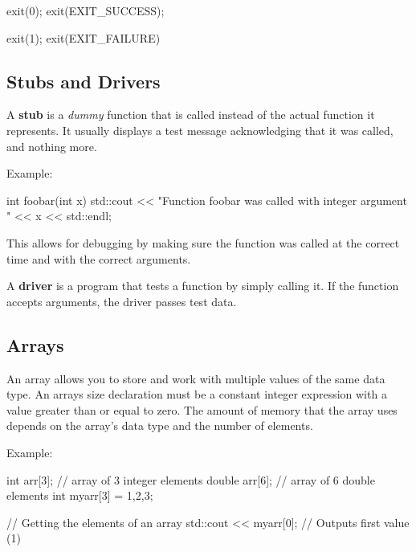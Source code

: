 \documentclass{report}
\begin{document}
    \begin{cppcode}
exit(0);
exit(EXIT_SUCCESS);

exit(1);
exit(EXIT_FAILURE)
    \end{cppcode}
    

    \pagebreak
    \subsection{Stubs and Drivers}
    \bigbreak \noindent 
    \begin{concept}
 A \textbf{stub} is a \textit{dummy} function that is called instead of the actual function it represents. It usually displays a test message acknowledging that it was called, and nothing more.
	\end{concept}
    \bigbreak \noindent 
    Example:
    \bigbreak \noindent 
    
    \begin{cppcode}
int foobar(int x) {
    std::cout << "Function foobar was called with integer argument " 
    << x 
    << std::endl;
}
    \end{cppcode}
    
    \bigbreak \noindent 
    This allows for debugging by making sure the function was called at the correct time and with the correct arguments.
    \bigbreak \noindent 
    \begin{concept}
 A \textbf{driver} is a program that tests a function by simply calling it. If the function accepts arguments, the driver passes test data.
	\end{concept}

    \pagebreak
    \bigbreak \noindent 
    \subsection{Arrays}
    \bigbreak \noindent 
    \begin{concept}
 An array allows you to store and work with multiple values of the same data type. An arrays size declaration must be a constant integer expression with a value greater than or equal to zero. The amount of memory that the array uses depends on the array's data type and the number of elements.
	\end{concept}
    \bigbreak \noindent 
    Example:
    \bigbreak \noindent 
    
    \begin{cppcode}
int arr[3]; // array of 3 integer elements
double arr[6]; // array of 6 double elements
int myarr[3] = {1,2,3};

// Getting the elements of an array
std::cout << myarr[0]; // Outputs first value (1)
    \end{cppcode}
    
\end{document}
